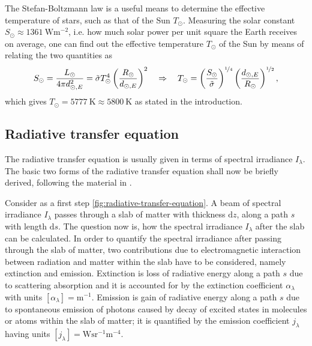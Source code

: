 \documentclass[a4paper,11pt]{report}
\def\lk#1{{\color{black}{#1}}}
\begin{document}
The Stefan-Boltzmann law is a useful means to determine the effective temperature of stars, such as that of the Sun $T_\odot$. Measuring the solar constant $S_\odot \approx \SI{1361}{\watt\meter^{-2}}$, i.e. how much solar power per unit square the Earth receives on average, one can find out the effective temperature $T_\odot$ of the Sun by means of relating the two quantities as \begin{equation}
S_\odot = \frac{L_\odot}{4\pi d_{\odot,E}^2} = \tilde{\sigma}T_\odot^4\left(\frac{R_\odot}{d_{\odot,E}}\right)^2 \quad \Rightarrow \quad T_{\odot} = \left(\frac{S_\odot}{\tilde{\sigma}}\right)^{\nicefrac{1}{4}}\left(\frac{d_{\odot,E}}{R_\odot}\right)^{\nicefrac{1}{2}},
\end{equation} which gives $T_\odot = \SI{5777}{\kelvin} \approx \SI{5800}{\kelvin}$ as stated in the introduction. 

\subsection{Radiative transfer equation}
The radiative transfer equation is usually given in terms of spectral irradiance $I_\lambda$. The basic two forms of the radiative transfer equation shall now be briefly derived, following the material in \cite[pp.27-40]{Rutten.2015}.

Consider as a first step \cref{fig:radiative-transfer-equation}. A beam of spectral irradiance $I_\lambda$ passes through a slab of matter with thickness $\mathrm{d}z$, along a path $s$ with length $\mathrm{d}s$. The question now is, how the spectral irradiance $I_\lambda$ after the slab can be calculated. In order to quantify the spectral irradiance after passing through the slab of matter, two contributions due to electromagnetic interaction between radiation and matter within the slab have to be considered, namely extinction and emission. Extinction is loss of radiative energy along a path $s$ due to scattering \lk{and/or} absorption and it is accounted for by the extinction coefficient $\alpha_\lambda$ with units $[\alpha_\lambda] = \si{\meter^{-1}}$. Emission is gain of radiative energy along a path $s$ due to spontaneous emission of photons caused by decay of excited states in molecules or atoms within the slab of matter; it is quantified by the emission coefficient $j_\lambda$ having units $[j_\lambda] = \si{\watt\steradian^{-1}\meter^{-4}}$.
\end{document}
